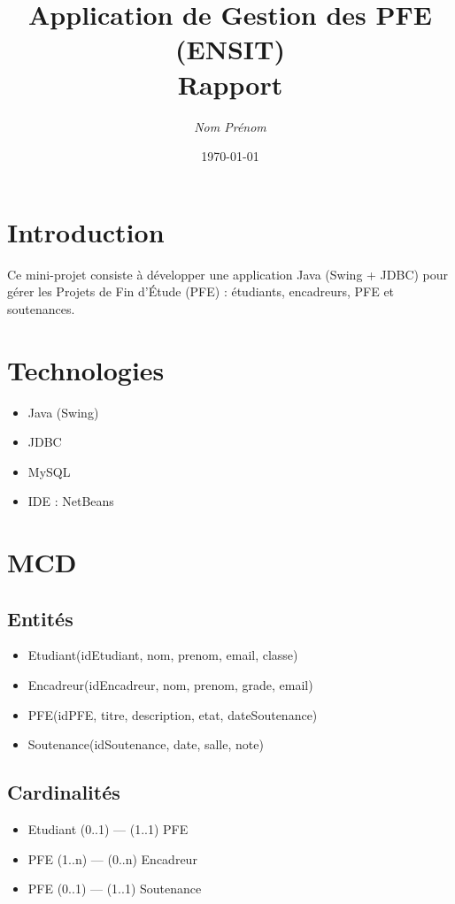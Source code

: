\documentclass[12pt,a4paper]{article}
\title{Application de Gestion des PFE (ENSIT) \\ Rapport}
\author{\textit{Nom Prénom}}
\date{\today}
\begin{document}
\maketitle
\tableofcontents
\newpage

\section{Introduction}
Ce mini-projet consiste à développer une application Java (Swing + JDBC) pour gérer les Projets de Fin d'Étude (PFE) : étudiants, encadreurs, PFE et soutenances.

\section{Technologies}
\begin{itemize}
  \item Java (Swing)
  \item JDBC
  \item MySQL
  \item IDE : NetBeans
\end{itemize}

\section{MCD}
\subsection{Entités}
\begin{itemize}
  \item Etudiant(idEtudiant, nom, prenom, email, classe)
  \item Encadreur(idEncadreur, nom, prenom, grade, email)
  \item PFE(idPFE, titre, description, etat, dateSoutenance)
  \item Soutenance(idSoutenance, date, salle, note)
\end{itemize}

\subsection{Cardinalités}
\begin{itemize}
  \item Etudiant (0..1) --- (1..1) PFE
  \item PFE (1..n) --- (0..n) Encadreur
  \item PFE (0..1) --- (1..1) Soutenance
\end{itemize}
\end{document}

